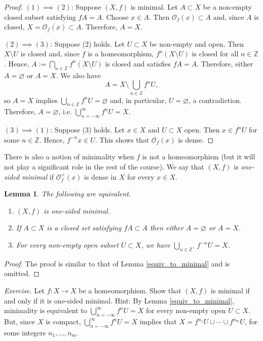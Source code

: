 \documentclass[12pt]{article}
\newtheorem{lemma}[theorem]{Lemma}
\theoremstyle{definition}
\theoremstyle{remark}
\begin{document}
\begin{proof} $(1) \implies (2)$: Suppose $(X,f)$ is minimal. Let $A \subset X$ be a non-empty closed subset satisfying $fA = A$. Choose $x \in A$. Then $\mathcal O_f(x) \subset A$ and, since $A$ is closed,
$X = \overline{\mathcal O_f(x)} \subset A$. Therefore, $A=X$.


\smallskip
\noindent
$(2) \implies (3)$: Suppose (2) holds. Let $U \subset X$ be non-empty and open. Then
$X\setminus U$ is closed and, since $f$ is a homeomorphism, $f^n(X\setminus U)$ is closed for all
$n \in \mathbb Z$. Hence,
$A := \bigcap_{n \in \mathbb Z} f^n(X\setminus U)$ is closed and satisfies $fA=A$. Therefore, either
$A =\varnothing$ or $A=X$. 
We also have
\[
A = X \setminus \bigcup_{n \in \mathbb Z} f^nU,
\]
so $A=X$ implies $\bigcup_{n \in \mathbb Z} f^nU = \varnothing$ and, in particular, $U = \varnothing$,
a contradiction. Therefore, $A = \varnothing$, i.e.
$\bigcup_{n =-\infty}^\infty f^nU=X$.

\smallskip
\noindent
$(3) \implies (1)$: Suppose (3) holds. Let $x \in X$ and $U \subset X$ open. Then $x \in f^nU$ for some $n \in \mathbb Z$. Hence, $f^{-n}x \in U$. This shows that $\mathcal O_f(x)$ is dense.
\end{proof}

There is also a notion of minimality when $f$ is not a homeomorphism (but it will not play a significant 
role in the rest of the course).
We say that $(X,f)$ is {\it one-sided minimal} if $\mathcal O_f^+(x)$ is dense in $X$ for every $x \in X$.


\begin{lemma}
The following are equivalent.
\begin{enumerate}
\item[(1)]
$(X,f)$ is one-sided minimal.
\item[(2)]
If $A \subset X$ is a closed set satisfying $fA \subset A$ then either $A = \varnothing$ or $A=X$.
\item[(3)]
For every non-empty open subset $U \subset X$, we have
$\bigcup_{n \in \mathbb Z^+} f^{-n}U=X$.
\end{enumerate}
\end{lemma}

\begin{proof}
The proof is similar to that of Lemma \ref{equiv_to_minimal} and is omitted.
\end{proof}

\medskip
\noindent
{\it Exercise.}
Let $f : X \to X$ be a homeomorphism. Show that $(X,f)$ is minimal if and only if it is one-sided minimal.
Hint: By Lemma \ref{equiv_to_minimal}, minimality is equivalent to $\bigcup_{n =-\infty}^\infty f^nU=X$ for every 
non-empty open $U \subset X$.
But, since $X$ is compact, $\bigcup_{n =-\infty}^\infty f^nU=X$ implies that
$X = f^{n_1}U \cup \cdots \cup f^{n_m}U$, for some integers $n_1,\ldots, n_m$.
\end{document}
